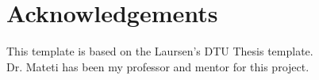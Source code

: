 \chapter{Acknowledgements}
This template is based on the Laursen's DTU Thesis template. \cite{overleaf} \\ 
Dr. Mateti has been my professor and mentor for this project.